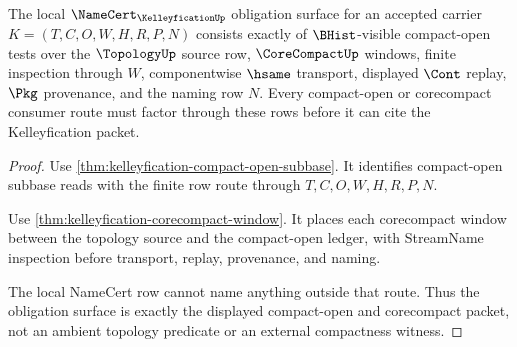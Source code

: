 \begin{theorem}
\label{thm:kelleyfication-namecert-obligation-surface}
The local $\NameCert_{\KelleyficationUp}$ obligation surface for an accepted carrier $K=(T,C,O,W,H,R,P,N)$ consists exactly of $\BHist$-visible compact-open tests over the $\TopologyUp$ source row, $\CoreCompactUp$ windows, finite inspection through $W$, componentwise $\hsame$ transport, displayed $\Cont$ replay, $\Pkg$ provenance, and the naming row $N$. Every compact-open or corecompact consumer route must factor through these rows before it can cite the Kelleyfication packet.
\end{theorem}
\begin{proof}
Use \autoref{thm:kelleyfication-compact-open-subbase}. It identifies compact-open subbase reads with the finite row route through $T,C,O,W,H,R,P,N$.

Use \autoref{thm:kelleyfication-corecompact-window}. It places each corecompact window between the topology source and the compact-open ledger, with StreamName inspection before transport, replay, provenance, and naming.

The local NameCert row cannot name anything outside that route. Thus the obligation surface is exactly the displayed compact-open and corecompact packet, not an ambient topology predicate or an external compactness witness.
\end{proof}

